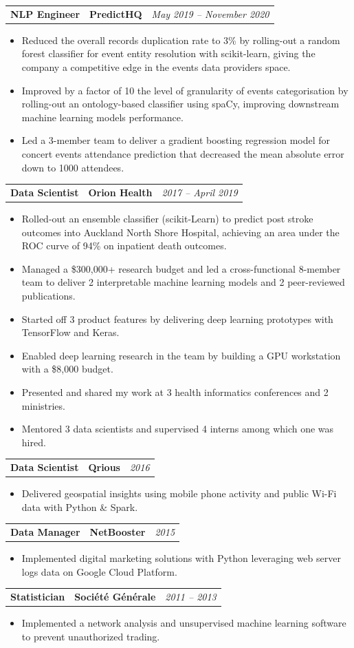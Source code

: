 \documentclass[letterpaper,11pt]{article}
\newcommand{\resumeItemListStart}{\begin{itemize}[label=$\circ$, topsep=0.1cm, parsep=0cm, partopsep=0cm, itemsep=0.1cm, leftmargin=0.4cm]}
\newcommand{\resumeItem}[1]{\item\small{#1}}
\newcommand{\resumeJustifiedItem}[1]{\item\begin{justify}\small{#1}\end{justify}}
\newcommand{\resumeItemListEnd}{\end{itemize}}
\newcommand{\job}[4]{
    \begin{tabular}{p{7cm}p{6cm}p{5cm}}
      \hspace{-0.7em} \textbf{#1} & \textbf{\small{#2}} & \hfill \textit{\small{#4}}
    \end{tabular}
}
\begin{document}
\job {NLP Engineer}{PredictHQ}{Auckland}{May 2019 -- November 2020}
\resumeItemListStart
\resumeJustifiedItem {Reduced the overall records duplication rate to 3\% by rolling-out a random forest classifier for event entity resolution with scikit-learn, giving the company a competitive edge in the events data providers space.}
\resumeJustifiedItem {Improved by a factor of 10 the level of granularity of events categorisation by rolling-out an ontology-based classifier using spaCy, improving downstream machine learning models performance.}
\resumeJustifiedItem {Led a 3-member team to deliver a gradient boosting regression model for concert events attendance prediction that decreased the mean absolute error down to 1000 attendees.}
\resumeItemListEnd \vspace{0.2cm}
	
\job {Data Scientist}{Orion Health}{Auckland}{2017 -- April 2019}
\resumeItemListStart
\resumeJustifiedItem {Rolled-out an ensemble classifier (scikit-Learn) to predict post stroke outcomes into Auckland North Shore Hospital, achieving an area under the ROC curve of 94\% on inpatient death outcomes.}
\resumeItem {Managed a \$300,000+ research budget and led a cross-functional 8-member team to deliver 2 interpretable machine learning models and 2 peer-reviewed publications.}
\resumeItem {Started off 3 product features by delivering deep learning prototypes with TensorFlow and Keras.}
\resumeItem {Enabled deep learning research in the team by building a GPU workstation with a \$8,000 budget.}
\resumeItem {Presented and shared my work at 3 health informatics conferences and 2 ministries.}
\resumeItem {Mentored 3 data scientists and supervised 4 interns among which one was hired.}
\resumeItemListEnd \vspace{0.2cm}

\job {Data Scientist}{Qrious}{Auckland}{2016}
\resumeItemListStart
\resumeItem {Delivered geospatial insights using mobile phone activity and public Wi-Fi data with Python \& Spark.}
\resumeItemListEnd \vspace{0.2cm}

\job {Data Manager}{NetBooster}{Paris}{2015}
\resumeItemListStart
\resumeItem {Implemented digital marketing solutions with Python leveraging web server logs data on Google Cloud Platform.}
\resumeItemListEnd \vspace{0.2cm}

\job {Statistician}{Société Générale}{Paris}{2011 -- 2013}
\resumeItemListStart
\resumeItem {Implemented a network analysis and unsupervised machine learning software to prevent unauthorized trading.}
\resumeItemListEnd 
\end{document}
